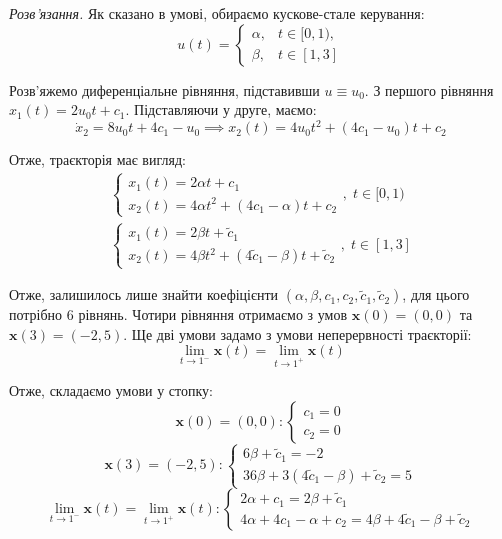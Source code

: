 \documentclass[oneside,solution]{karazin-control-assign}
\begin{document}
\textit{Розв'язання.} Як сказано в умові, обираємо кускове-стале керування:
\begin{equation}
    u(t) = \begin{cases}
        \alpha, & t \in [0,1), \\
        \beta, & t \in [1,3]
    \end{cases}
\end{equation}

Розв'яжемо диференціальне рівняння, підставивши $u \equiv u_0$. З першого рівняння $x_1(t) = 2u_0 t + c_1$. Підставляючи у друге, маємо:
\begin{equation}
    \dot{x}_2 = 8u_0t + 4c_1 - u_0 \implies x_2(t) = 4u_0t^2 + (4c_1 - u_0)t + c_2
\end{equation}

Отже, траєкторія має вигляд:
\begin{gather}
    \begin{cases}
        x_1(t) = 2\alpha t + c_1 \\
        x_2(t) = 4\alpha t^2 + (4c_1 - \alpha)t + c_2
    \end{cases}, \; t \in [0,1) \\
    \begin{cases}
        x_1(t) = 2\beta t + \widetilde{c}_1 \\
        x_2(t) = 4\beta t^2 + (4\widetilde{c}_1 - \beta)t + \widetilde{c}_2
    \end{cases}, \; t \in [1,3]
\end{gather}

Отже, залишилось лише знайти коефіцієнти $(\alpha,\beta,c_1,c_2,\widetilde{c}_1,\widetilde{c}_2)$, для цього потрібно $6$ рівнянь. Чотири рівняння отримаємо з умов $\mathbf{x}(0)=(0,0)$ та $\mathbf{x}(3)=(-2,5)$. Ще дві умови задамо з умови неперервності траєкторії:
\begin{equation}
    \lim_{t \to 1^-}\mathbf{x}(t) = \lim_{t \to 1^+}\mathbf{x}(t)
\end{equation}

Отже, складаємо умови у стопку:
\begin{equation}
    \mathbf{x}(0) = (0,0):  \begin{cases}
        c_1 = 0 \\ c_2 = 0
    \end{cases}
\end{equation}
\begin{equation}
    \mathbf{x}(3) = (-2,5): \begin{cases}
        6\beta + \widetilde{c}_1 = -2 \\
        36\beta + 3(4\widetilde{c}_1-\beta) + \widetilde{c}_2 = 5
    \end{cases}
\end{equation}
\begin{equation}
    \lim_{t \to 1^-}\mathbf{x}(t) = \lim_{t \to 1^+}\mathbf{x}(t): \begin{cases}
        2\alpha + c_1 = 2\beta + \widetilde{c}_1 \\ 
        4\alpha + 4c_1 - \alpha + c_2 = 4\beta + 4\widetilde{c}_1-\beta + \widetilde{c}_2 
    \end{cases}
\end{equation}
\end{document}
